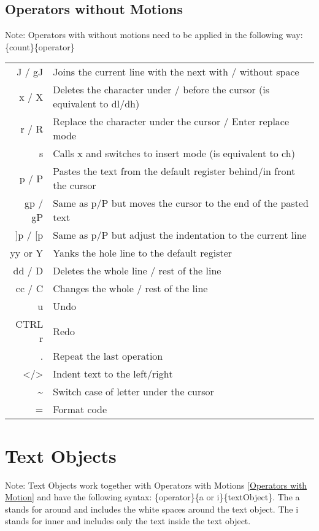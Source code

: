\documentclass{article}
\begin{document}
\subsection{Operators without Motions}
Note: Operators with without motions need to be applied in the following way: \{count\}\{operator\}

\vspace{3mm} 
\begin{tabular}{ r l }
 J / gJ & Joins the current line with the next with / without space \\[0.5ex]
 x / X & Deletes the character under / before the cursor (is equivalent to dl/dh)\\[0.5ex]
 r / R & Replace the character under the cursor / Enter replace mode\\[0.5ex]
 s & Calls x and switches to insert mode (is equivalent to ch)\\[0.5ex]
 p / P & Pastes the text from the default register behind/in front the cursor \\[0.5ex]
 gp / gP & Same as p/P but moves the cursor to the end of the pasted text\\[0.5ex]
 ]p / [p & Same as p/P but adjust the indentation to the current line\\[0.5ex]
 yy or Y & Yanks the hole line to the default register \\[0.5ex]
 dd / D & Deletes the whole line / rest of the line\\[0.5ex]
 cc / C & Changes the whole / rest of the line\\[0.5ex]
 u & Undo \\[0.5ex]
 CTRL r & Redo \\[0.5ex]
 . & Repeat the last operation \\[0.5ex]
 \textless /\textgreater & Indent text to the left/right \\[0.5ex]
 {}\~ & Switch case of letter under the cursor\\[0.5ex]
 = & Format code \\[0.5ex]
\end{tabular}

\section{Text Objects}
Note: Text Objects work together with Operators with Motions \ref{Operators with Motion} and have the following syntax: \{operator\}\{a or i\}\{textObject\}. The a stands for around and includes the white spaces around the text object. The i stands for inner and includes only the text inside the text object. 
\end{document}

